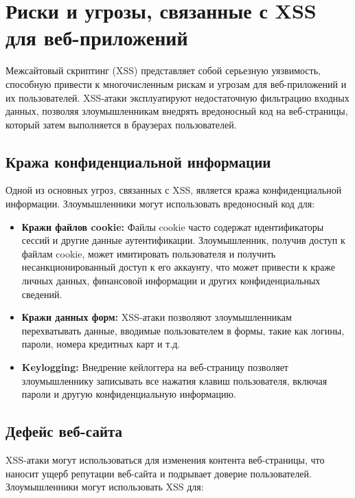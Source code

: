 \documentclass[a4paper,12pt]{diplom}
\begin{document}
	 
	 
	 
	 
	 
	 \section{Риски и угрозы, связанные с XSS для веб-приложений}
	 
	 Межсайтовый скриптинг (XSS) представляет собой серьезную уязвимость, способную привести к многочисленным рискам и угрозам для веб-приложений и их пользователей. XSS-атаки эксплуатируют недостаточную фильтрацию входных данных, позволяя злоумышленникам внедрять вредоносный код на веб-страницы, который затем выполняется в браузерах пользователей. 
	 
	 \subsection{Кража конфиденциальной информации}
	 
	 Одной из основных угроз, связанных с XSS, является кража конфиденциальной информации. Злоумышленники могут использовать вредоносный код для:
	 
	 \begin{itemize}
	 	\item \textbf{Кражи файлов cookie:} Файлы cookie часто содержат идентификаторы сессий и другие данные аутентификации. Злоумышленник, получив доступ к файлам cookie, может имитировать пользователя и получить несанкционированный доступ к его аккаунту, что может привести к краже личных данных, финансовой информации и других конфиденциальных сведений.
	 	\item \textbf{Кражи данных форм:}  XSS-атаки позволяют злоумышленникам перехватывать данные, вводимые пользователем в формы, такие как логины, пароли, номера кредитных карт и т.д. 
	 	\item \textbf{Keylogging:} Внедрение кейлоггера на веб-страницу позволяет злоумышленнику записывать все нажатия клавиш пользователя, включая пароли и другую конфиденциальную информацию.
	 \end{itemize}
	 
	 \subsection{Дефейс веб-сайта}
	 
	 XSS-атаки могут использоваться для изменения контента веб-страницы, что наносит ущерб репутации веб-сайта и подрывает доверие пользователей. Злоумышленники могут использовать XSS для:
	 
\end{document}
